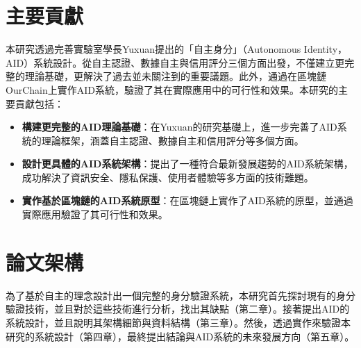 \section{主要貢獻}
本研究透過完善實驗室學長Yuxuan\cite{ntu-lin2014autonomous}提出的「自主身分」（Autonomous Identity，AID）系統設計。從自主認證、數據自主與信用評分三個方面出發，不僅建立更完整的理論基礎，更解決了過去並未關注到的重要議題。此外，通過在區塊鏈OurChain\cite{ourlab408_ourchain}上實作AID系統，驗證了其在實際應用中的可行性和效果。本研究的主要貢獻包括：
\begin{itemize}
  \item \textbf{構建更完整的AID理論基礎}：在Yuxuan的研究基礎上，進一步完善了AID系統的理論框架，涵蓋自主認證、數據自主和信用評分等多個方面。
  \item \textbf{設計更具體的AID系統架構}：提出了一種符合最新發展趨勢的AID系統架構，成功解決了資訊安全、隱私保護、使用者體驗等多方面的技術難題。
  \item \textbf{實作基於區塊鏈的AID系統原型}：在區塊鏈上實作了AID系統的原型，並通過實際應用驗證了其可行性和效果。
\end{itemize}
\section{論文架構}
為了基於自主的理念設計出一個完整的身分驗證系統，本研究首先探討現有的身分驗證技術，並且對於這些技術進行分析，找出其缺點（第二章）。接著提出AID的系統設計，並且說明其架構細節與資料結構（第三章）。然後，透過實作來驗證本研究的系統設計（第四章），最終提出結論與AID系統的未來發展方向（第五章）。